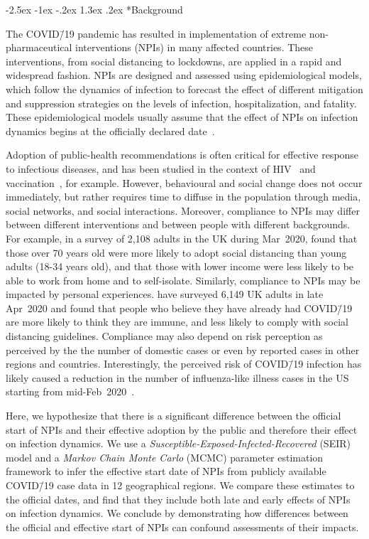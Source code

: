 \documentclass[12pt]{extarticle}
\makeatletter
\renewcommand\section{\@startsection {section}{1}{\z@}%
     {-2.5ex \@plus -1ex \@minus -.2ex}%
     {1.3ex \@plus.2ex}%
    {\Large\bfseries}}
\newcommand{\covid}{COVID\=/19 }
\makeatother
\begin{document}
\section*{Background}

The \covid pandemic has resulted in implementation of extreme non-pharmaceutical interventions (NPIs) in many affected countries. These interventions, from social distancing to lockdowns, are applied in a rapid and widespread fashion.
NPIs are designed and assessed using epidemiological models, which follow the dynamics of infection to forecast the effect of different mitigation and suppression strategies on the levels of infection, hospitalization, and fatality.
These epidemiological models usually assume that the effect of NPIs on infection dynamics begins at the officially declared date~\citep{Flaxman2020,Gatto2020,Li2020}.

Adoption of public-health recommendations is often critical for effective response to infectious diseases, and has been studied in the context of HIV~\citep{Kaufman2014} and vaccination~\citep{Dunn2015,Wiyeh2018}, for example.
However, behavioural and social change does not occur immediately, but rather requires time to diffuse in the population through media, social networks, and social interactions. 
Moreover, compliance to NPIs may differ between different interventions and between people with different backgrounds.
For example, in a survey of 2,108 adults in the UK during Mar~2020, \citet{Atchison2020} found that those over 70 years old were more likely to adopt social distancing than young adults (18-34 years old), and that those with lower income were less likely to be able to work from home and to self-isolate.
Similarly, compliance to NPIs may be impacted by personal experiences. \citet{Smith2020} have surveyed 6,149 UK adults in late Apr~2020 and found that people who believe they have already had \covid are more likely to think they are immune, and less likely to comply with social distancing guidelines. 
Compliance may also depend on risk perception as perceived by the the number of domestic cases or even by reported cases in other regions and countries.
Interestingly, the perceived risk of \covid infection has likely caused a reduction in the number of influenza-like illness cases in the US starting from mid-Feb~2020~\citep{Zipfel2020}.

Here, we hypothesize that there is a significant difference between the official start of NPIs and their effective adoption by the public and therefore their effect on infection dynamics.
We use a \textit{Susceptible-Exposed-Infected-Recovered} (SEIR) model and a \textit{Markov Chain Monte Carlo} (MCMC) parameter estimation framework to infer the effective start date of NPIs from publicly available \covid case data in 12 geographical regions.
We compare these estimates to the official dates, and find that they include both late and early effects of NPIs on infection dynamics.
We conclude by demonstrating how differences between the official and effective start of NPIs can confound assessments of their impacts.
\end{document}
